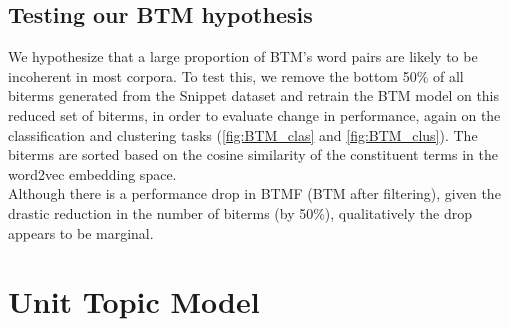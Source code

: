 \documentclass{sig-alternate-05-2015}
\begin{document}
\subsection{Testing our BTM hypothesis}
We hypothesize that a large proportion of BTM's word pairs are likely to be incoherent in most corpora. To test this, we remove the bottom 50\% of all biterms generated from the Snippet dataset and retrain the BTM model on this reduced set of biterms, in order to evaluate change in performance, again on the classification and clustering tasks (\ref{fig:BTM_clas} and \ref{fig:BTM_clus}). The biterms are sorted based on the cosine similarity of the constituent terms in the word2vec embedding space.
\\[5pt]
Although there is a performance drop in BTMF (BTM after filtering), given the drastic reduction in the number of biterms (by 50\%), qualitatively the drop appears to be marginal.

\section{Unit Topic Model}
\end{document}
